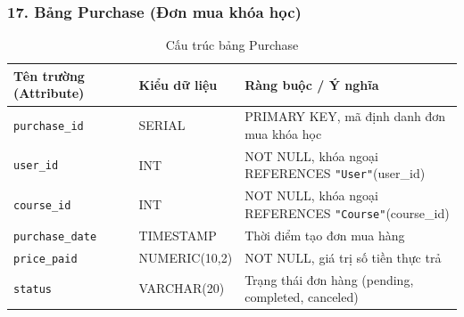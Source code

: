 \documentclass[../DoAn.tex]{subfiles}
\begin{document}
\subsubsection*{17. Bảng Purchase (Đơn mua khóa học)}
\begin{table}[H]
\centering
\footnotesize
\renewcommand{\arraystretch}{1.2}
\begin{tabular}{|p{4.2cm}|p{3.2cm}|p{7.1cm}|}
\hline
\textbf{Tên trường (Attribute)} & \textbf{Kiểu dữ liệu} & \textbf{Ràng buộc / Ý nghĩa} \\
\hline
\texttt{purchase\_id} & SERIAL & PRIMARY KEY, mã định danh đơn mua khóa học \\
\hline
\texttt{user\_id} & INT & NOT NULL, khóa ngoại REFERENCES \texttt{"User"}(user\_id) \\
\hline
\texttt{course\_id} & INT & NOT NULL, khóa ngoại REFERENCES \texttt{"Course"}(course\_id) \\
\hline
\texttt{purchase\_date} & TIMESTAMP & Thời điểm tạo đơn mua hàng \\
\hline
\texttt{price\_paid} & NUMERIC(10,2) & NOT NULL, giá trị số tiền thực trả \\
\hline
\texttt{status} & VARCHAR(20) & Trạng thái đơn hàng (pending, completed, canceled) \\
\hline
\end{tabular}
\caption{Cấu trúc bảng Purchase}
\label{tab:schema_purchase}
\end{table}
\end{document}
